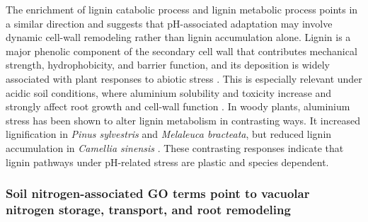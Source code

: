 \documentclass[unnumsec,webpdf,contemporary,large]{oup-authoring-template}%
\theoremstyle{thmstyleone}%
\theoremstyle{thmstyletwo}%
\theoremstyle{thmstylethree}%
\begin{document}
The enrichment of lignin catabolic process and lignin metabolic process points in a similar direction and suggests that pH-associated adaptation may involve dynamic cell-wall remodeling rather than lignin accumulation alone. Lignin is a major phenolic component of the secondary cell wall that contributes mechanical strength, hydrophobicity, and barrier function, and its deposition is widely associated with plant responses to abiotic stress \citep{Han2022,Jalal2025}. This is especially relevant under acidic soil conditions, where aluminium solubility and toxicity increase and strongly affect root growth and cell-wall function \citep{Han2022}. In woody plants, aluminium stress has been shown to alter lignin metabolism in contrasting ways. It increased lignification in \textit{Pinus sylvestris} and \textit{Melaleuca bracteata}, but reduced lignin accumulation in \textit{Camellia sinensis} \citep{Han2022}. These contrasting responses indicate that lignin pathways under pH-related stress are plastic and species dependent.


\subsubsection{Soil nitrogen-associated GO terms point to vacuolar nitrogen storage, transport, and root remodeling}
\end{document}
